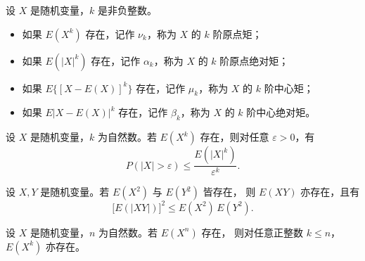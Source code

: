 \begin{definition}
设 $X$ 是随机变量，$k$ 是非负整数。
\begin{itemize}
  \item 如果 $E(X^k)$ 存在，记作 $\nu_k$，称为 $X$ 的 $k$ 阶原点矩；
  \item 如果 $E(|X|^k)$ 存在，记作 $\alpha_k$，称为 $X$ 的 $k$ 阶原点绝对矩；
  \item 如果 $E\{[X-E(X)]^k\}$ 存在，记作 $\mu_k$，称为 $X$ 的 $k$ 阶中心矩；
  \item 如果 $E|X-E(X)|^k$ 存在，记作 $\beta_k$，称为 $X$ 的 $k$ 阶中心绝对矩。
\end{itemize}
\end{definition}
\begin{theorem}
设 $X$ 是随机变量，$k$ 为自然数。若 $E(X^k)$ 存在，则对任意 $\varepsilon > 0$，有
\[
P(|X|>\varepsilon)\le \frac{E(|X|^k)}{\varepsilon^k}.
\]
\end{theorem}
\begin{theorem}
设 $X, Y$ 是随机变量。若 $E(X^2)$ 与 $E(Y^2)$ 皆存在，  
则 $E(XY)$ 亦存在，且有
\[
\bigl[E(|XY|)\bigr]^2 \le E(X^2)\,E(Y^2).
\]
\end{theorem}
\begin{theorem}
设 $X$ 是随机变量，$n$ 为自然数。若 $E(X^n)$ 存在，  
则对任意正整数 $k \le n$，$E(X^k)$ 亦存在。
\end{theorem}
